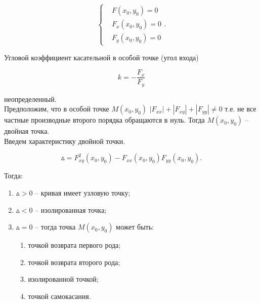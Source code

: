 				\begin{equation}
					\begin{cases}
						& F \left( x_{0}, y_{0} \right) = 0\\
						& F_{x} \left( x_{0}, y_{0} \right) = 0\\
						& F_{y} \left( x_{0}, y_{0} \right) = 0
					\end{cases}.
				\end{equation}

				Угловой коэффициент касательной в особой точке (угол входа)

				\begin{equation}
					k = - \frac{F_{x}}{F_{y}}
				\end{equation}

				неопределенный.\\

				Предположим, что в особой точке $M \left( x_{0}, y_{0} \right)$ $\left| F_{xx} \right| + \left| F_{xy} \right| + \left| F_{yy} \right| \neq 0$ т.е. не все частные производные второго порядка обращаются в нуль. Тогда $M \left( x_{0}, y_{0} \right)$ -- двойная точка.\\

				Введем характеристику двойной точки.

				\begin{equation}
					\vartriangle = F^{2}_{xy} \left( x_{0}, y_{0} \right) - F_{xx} \left( x_{0}, y_{0} \right) F_{yy} \left( x_{0}, y_{0} \right).
				\end{equation}

				Тогда:

				\begin{enumerate}
					\item $\vartriangle > 0$ -- кривая имеет узловую точку;

					\item $\vartriangle < 0$ -- изолированная точка;

					\item $\vartriangle = 0$ -- тогда точка $M \left( x_{0}, y_{0} \right)$ может быть:

					\begin{enumerate}
						\item точкой возврата первого рода;

						\item точкой возврата второго рода;

						\item изолированной точкой;

						\item точкой самокасания. 
					\end{enumerate}
				\end{enumerate}

